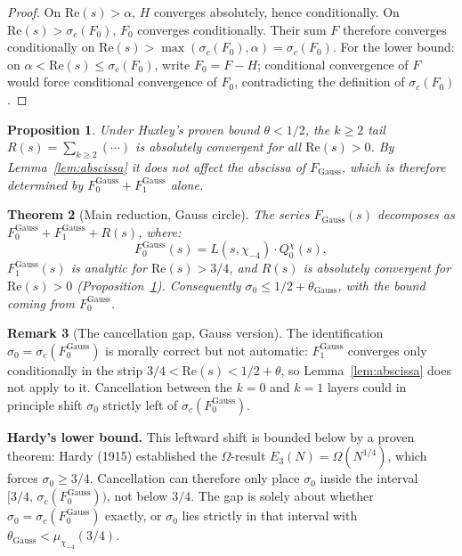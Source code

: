 \documentclass[12pt]{article}
\newtheorem{theorem}{Theorem}
\newtheorem{proposition}[theorem]{Proposition}
\theoremstyle{definition}
\newtheorem{remark}[theorem]{Remark}
\begin{document}
\begin{proof}
On $\mathrm{Re}(s) > \alpha$, $H$ converges absolutely, hence conditionally.
On $\mathrm{Re}(s) > \sigma_c(F_0)$, $F_0$ converges conditionally.  Their
sum $F$ therefore converges conditionally on
$\mathrm{Re}(s) > \max(\sigma_c(F_0),\alpha) = \sigma_c(F_0)$.
For the lower bound: on $\alpha < \mathrm{Re}(s) \le \sigma_c(F_0)$,
write $F_0 = F - H$; conditional convergence of $F$ would force conditional
convergence of $F_0$, contradicting the definition of $\sigma_c(F_0)$.
\end{proof}

\begin{proposition}
\label{prop:tailconv}
Under Huxley's proven bound $\theta < 1/2$, the $k \ge 2$ tail
$R(s) = \sum_{k\ge 2}(\cdots)$ is absolutely convergent for all
$\mathrm{Re}(s) > 0$.  By Lemma~\ref{lem:abscissa} it does not affect the
abscissa of $F_{\mathrm{Gauss}}$, which is therefore determined by
$F_0^{\mathrm{Gauss}} + F_1^{\mathrm{Gauss}}$ alone.
\end{proposition}

\begin{theorem}[Main reduction, Gauss circle]
\label{thm:Gaussmain}
The series $F_{\mathrm{Gauss}}(s)$ decomposes as
$F_0^{\mathrm{Gauss}} + F_1^{\mathrm{Gauss}} + R(s)$, where:
\begin{equation}
    \boxed{F_0^{\mathrm{Gauss}}(s) = L(s,\chi_{-4})\cdot Q_0^{\chi}(s),}
    \label{eq:Gaussbox}
\end{equation}
$F_1^{\mathrm{Gauss}}(s)$ is analytic for $\mathrm{Re}(s) > 3/4$, and
$R(s)$ is absolutely convergent for $\mathrm{Re}(s) > 0$
(Proposition~\ref{prop:tailconv}).  Consequently
$\sigma_0 \le 1/2 + \theta_{\mathrm{Gauss}}$, with the bound coming from
$F_0^{\mathrm{Gauss}}$.
\end{theorem}

\begin{remark}[The cancellation gap, Gauss version]
\label{rem:gapG}
The identification $\sigma_0 = \sigma_c(F_0^{\mathrm{Gauss}})$ is morally
correct but not automatic: $F_1^{\mathrm{Gauss}}$ converges only
conditionally in the strip $3/4 < \mathrm{Re}(s) < 1/2+\theta$, so
Lemma~\ref{lem:abscissa} does not apply to it.  Cancellation between the
$k=0$ and $k=1$ layers could in principle shift $\sigma_0$ strictly left of
$\sigma_c(F_0^{\mathrm{Gauss}})$.

\textbf{Hardy's lower bound.}  This leftward shift is bounded below by a
proven theorem: Hardy (1915) established the $\Omega$-result
$E_3(N) = \Omega(N^{1/4})$, which forces $\sigma_0 \ge 3/4$.
Cancellation can therefore only place $\sigma_0$ inside the interval
$[3/4,\,\sigma_c(F_0^{\mathrm{Gauss}}))$, not below $3/4$.  The gap is
solely about whether $\sigma_0 = \sigma_c(F_0^{\mathrm{Gauss}})$ exactly, or
$\sigma_0$ lies strictly in that interval with $\theta_{\mathrm{Gauss}} < \mu_{\chi_{-4}}(3/4)$.
\end{remark}
\end{document}
